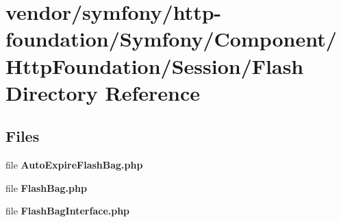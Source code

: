 \section{vendor/symfony/http-\/foundation/\+Symfony/\+Component/\+Http\+Foundation/\+Session/\+Flash Directory Reference}
\label{dir_737d1b879316adfd63eed97681c71900}
\subsection*{Files}
\begin{DoxyCompactItemize}
\item 
file {\bf Auto\+Expire\+Flash\+Bag.\+php}
\item 
file {\bf Flash\+Bag.\+php}
\item 
file {\bf Flash\+Bag\+Interface.\+php}
\end{DoxyCompactItemize}
